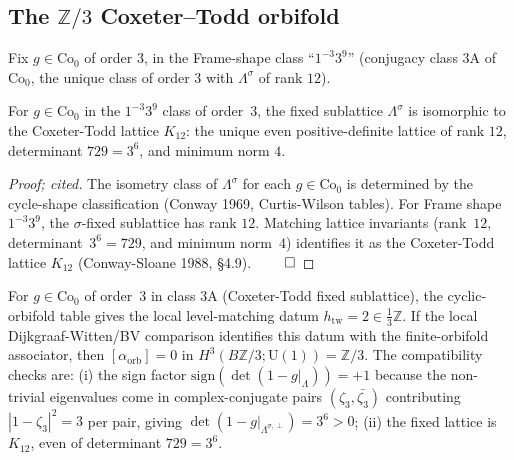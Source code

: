 \subsection{The $\mathbb{Z}/3$ Coxeter--Todd orbifold}
\label{subsec:schellekens-z3-coxeter-todd}

Fix
$g \in \mathrm{Co}_0$ of order $3$, in the Frame-shape class
``$1^{-3} 3^9$'' (conjugacy class $3\mathrm{A}$ of $\mathrm{Co}_0$, the
unique class of order $3$ with $\Lambda^\sigma$ of rank $12$).

\begin{lemma}
\label{lem:coxeter-todd-leech-z3-fixed}
For $g \in \mathrm{Co}_0$ in the $1^{-3} 3^9$ class of order~$3$,
the fixed sublattice $\Lambda^\sigma$ is isomorphic to the Coxeter-Todd
lattice $K_{12}$: the unique even positive-definite lattice of rank
$12$, determinant $729=3^6$, and minimum norm $4$.
\end{lemma}

\begin{proof}[Proof; cited]
The isometry class of $\Lambda^\sigma$ for each $g \in \mathrm{Co}_0$
is determined by the cycle-shape classification (Conway 1969,
Curtis-Wilson tables). For Frame shape $1^{-3} 3^9$, the $\sigma$-fixed
sublattice has rank $12$. Matching lattice invariants (rank~$12$,
determinant~$3^6 = 729$, and minimum norm~$4$) identifies it as the
Coxeter-Todd lattice $K_{12}$ (Conway-Sloane 1988, \S 4.9). $\qed$
\end{proof}

\begin{proposition}
\label{prop:z3-coxeter-todd-alpha-zero-explicit}
For $g \in \mathrm{Co}_0$ of order~$3$ in class $3\mathrm{A}$
(Coxeter-Todd fixed sublattice), the cyclic-orbifold table gives the
local level-matching datum
$h_{\mathrm{tw}}=2\in\frac{1}{3}\mathbb{Z}$. If the local
Dijkgraaf-Witten/BV comparison identifies this datum with the
finite-orbifold associator, then $[\alpha_{\mathrm{orb}}]=0$ in
$H^3(B\mathbb{Z}/3; \mathrm{U}(1)) = \mathbb{Z}/3$. The compatibility
checks are: (i) the sign factor
$\mathrm{sign}(\det(1 - g|_\Lambda)) = +1$ because
the non-trivial eigenvalues come in complex-conjugate pairs
$(\zeta_3, \bar{\zeta_3})$ contributing
$|1 - \zeta_3|^2 = 3$ per pair, giving
$\det(1 - g|_{\Lambda^{\sigma,\perp}})=3^6>0$; (ii) the fixed lattice
is $K_{12}$, even of determinant $729=3^6$.
\end{proposition}

